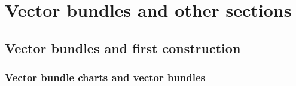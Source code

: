 \documentclass{article}
\begin{document}
\begin{proposition}[1.4.26]
\end{proposition}

\begin{definition}
\end{definition}

\begin{proposition}[1.4.28]
\end{proposition}

\begin{theorem}[Whitney]
\end{theorem}

\newpage
\section{Vector bundles and other sections}

\subsection{Vector bundles and first construction}

\subsubsection{Vector bundle charts and vector bundles}

\begin{definition}
\end{definition}

\begin{definition}
\end{definition}

\begin{proposition}[2.1.18]
\end{proposition}

\begin{example}[2.1.4]
\end{example}

\begin{example}
\end{example}

\begin{example}
\end{example}

\begin{example}[2.1.1]
\end{example}
\end{document}

